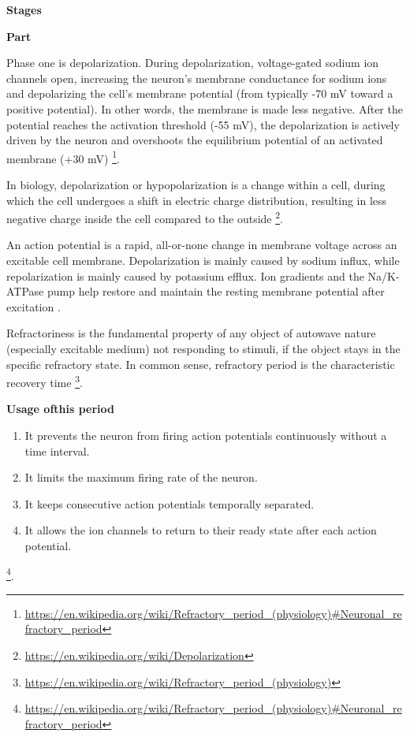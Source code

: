 \documentclass{book}
\providecommand{\ProjectDeepHeading}[2]{%
    \par\medskip\noindent\textbf{#2}\par\smallskip
}
\providecommand{\seeherefooter}[1]{\footnote{\url{#1}}}
\begin{document}
\ProjectDeepHeading{6}{Stages}

\ProjectDeepHeading{7}{Part}


Phase one is depolarization. During depolarization, voltage-gated sodium ion channels open, increasing the neuron's membrane conductance for sodium ions and depolarizing the cell's membrane potential (from typically -70 mV toward a positive potential). In other words, the membrane is made less negative. After the potential reaches the activation threshold (-55 mV), the depolarization is actively driven by the neuron and overshoots the equilibrium potential of an activated membrane (+30 mV)
    \seeherefooter{https://en.wikipedia.org/wiki/Refractory_period_(physiology)\#Neuronal_refractory_period}.
    
    In biology, depolarization or hypopolarization is a change within a cell, during which the cell undergoes a shift in electric charge distribution, resulting in less negative charge inside the cell compared to the outside \seeherefooter{https://en.wikipedia.org/wiki/Depolarization}.
    
    An action potential is a rapid, all-or-none change in membrane voltage across an excitable cell membrane. Depolarization is mainly caused by sodium influx, while repolarization is mainly caused by potassium efflux. Ion gradients and the Na/K-ATPase pump help restore and maintain the resting membrane potential after excitation \cite{grider-2023-physiology-action-potential}.


Refractoriness is the fundamental property of any object of autowave nature (especially excitable medium) not responding to stimuli, if the object stays in the specific refractory state. In common sense, refractory period is the characteristic recovery time \seeherefooter{https://en.wikipedia.org/wiki/Refractory_period_(physiology)}.
    
    
    \ProjectDeepHeading{10}{Usage ofthis period}
        \begin{enumerate}
            \item It prevents the neuron from firing action potentials continuously without a time interval.
            \item It limits the maximum firing rate of the neuron.
            \item It keeps consecutive action potentials temporally separated.
            \item It allows the ion channels to return to their ready state after each action potential.
        \end{enumerate}
        \seeherefooter{https://en.wikipedia.org/wiki/Refractory_period_(physiology)\#Neuronal_refractory_period}.
%    
%
\end{document}
